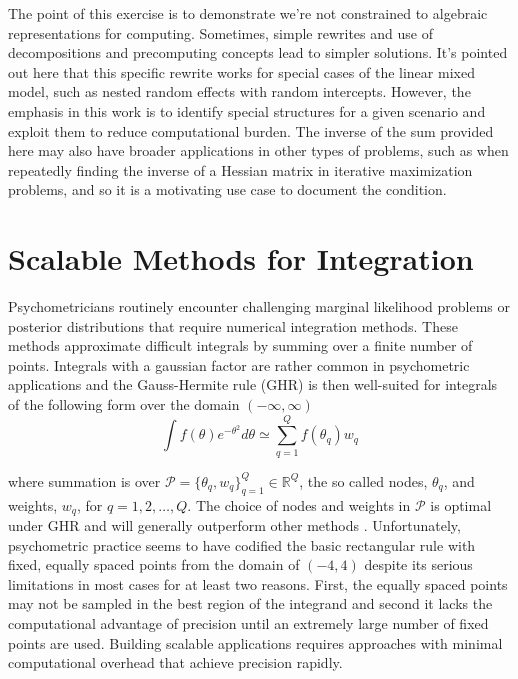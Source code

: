 \documentclass[12pt]{article}
\begin{document}
The point of this exercise is to demonstrate we're not constrained to algebraic representations for computing. Sometimes, simple rewrites and use of decompositions and precomputing concepts lead to simpler solutions. It's pointed out here that this specific rewrite works for special cases of the linear mixed model, such as nested random effects with random intercepts. However, the emphasis in this work is to identify special structures for a given scenario and exploit them to reduce computational burden. The inverse of the sum provided here may also have broader applications in other types of problems, such as when repeatedly finding the inverse of a Hessian matrix in iterative maximization problems, and so it is a motivating use case to document the condition. 

\section*{Scalable Methods for Integration}

Psychometricians routinely encounter challenging marginal likelihood problems or posterior distributions that require numerical integration methods. These methods approximate difficult integrals by summing over a finite number of points. Integrals with a gaussian factor are rather common in psychometric applications and the Gauss-Hermite rule (GHR) is then well-suited for integrals of the following form over the domain $(-\infty,\infty)$
\begin{equation}
\label{eqn:integral}
\int f(\theta)e^{-\theta^2} d\theta \simeq \sum_{q=1}^Q f(\theta_q)w_q
\end{equation}

\noindent where summation is over $\mathcal{P}=\{\theta_q,w_q\}^Q_{q=1} \in \mathbb{R}^Q$, the so called nodes, $\theta_q$, and weights, $w_q$, for $q = 1,2, \ldots, Q$. The choice of nodes and weights in $\mathcal{P}$ is optimal under GHR and will generally outperform other methods \cite{Quarteroni}. Unfortunately, psychometric practice seems to have codified the basic rectangular rule with fixed, equally spaced points from the domain of $(-4,4)$ \cite{bock:eap} despite its serious limitations in most cases for at least two reasons. First, the equally spaced points may not be sampled in the best region of the integrand and second it lacks the computational advantage of precision until an extremely large number of fixed points are used. Building scalable applications requires approaches with minimal computational overhead that achieve precision rapidly. 
\end{document}
